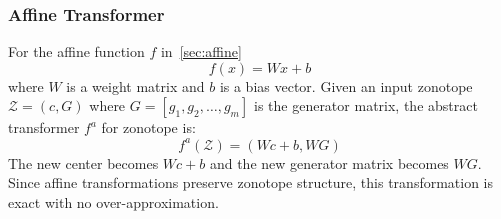 \documentclass[oneside,11pt,dvipsnames]{book}
\numberwithin{equation}{section}
\theoremstyle{definition}
\theoremstyle{remark}
\newcommand{\tvn}[1]{\iftoggle{usecomment}{{\color{red}{[TVN]: #1}}}{}}
\begin{document}




\subsubsection{Affine Transformer} For the affine function \(f\) in~\autoref{sec:affine}
\[f(x) = Wx + b\]
where \(W\) is a weight matrix and \(b\) is a bias vector. Given an input zonotope \(\mathcal{Z} = (c, G)\) where \(G = [g_1, g_2, \ldots, g_m]\) is the generator matrix, the abstract transformer \(f^a\) for zonotope is:
\[
f^a(\mathcal{Z}) = (Wc + b, WG)
\]
The new center becomes \(Wc + b\) and the new generator matrix becomes \(WG\). Since affine transformations preserve zonotope structure, this transformation is exact with no over-approximation.
\end{document}
